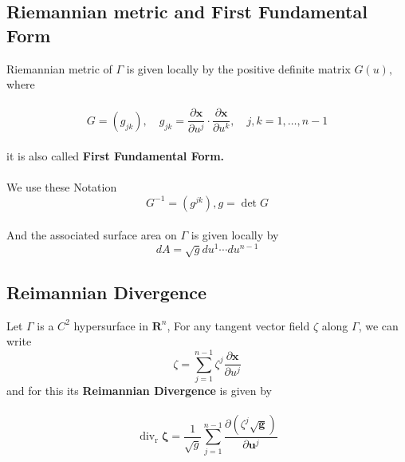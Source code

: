 \documentclass[oneside]{book}
\begin{document}
	\subsection{Riemannian metric and First Fundamental Form}
	\label{ss:12}
	{Riemannian metric} of $\Gamma$ is given
	locally by the positive definite matrix $G(u),$ where 
	\\\\
	\begin{equation}
	\label{eq17}  
	G=\left(g_{j k}\right), \quad g_{j k}=\frac{\partial \mathbf{x}}{\partial u^{j}} \cdot \frac{\partial \mathbf{x}}{\partial u^{k}}, \quad j, k=1, \ldots, n-1     \end{equation}
	\\
	it is also called \textbf{First Fundamental Form.} \\\\
	We use these Notation \\
	\[ G^{-1}=\left(g^{j k}\right),   g=\operatorname{det}{G} \] \\
	And the associated surface area on  
	$\Gamma$ is given locally by \\
	
	
	\begin{equation}
	\label{eq18}  
	d A=\sqrt{g} d u^{1} \cdots d u^{n-1} 
	\end{equation}
	
	
	
	
	
	
	
	
	
	
	\subsection{Reimannian Divergence}
	\label{ss:13}
	Let $\Gamma$ is a $C^{2}$ hypersurface in $\mathbf{R}^{n}$,
	For any tangent vector field $\zeta$ along $\Gamma$, we can write 
	$$
	\zeta=\sum_{j=1}^{n-1} \zeta^{j} \frac{\partial \mathbf{x}}{\partial u^{j}}
	$$
	and for this its \textbf{Reimannian Divergence} is given by \\\\
	\begin{equation}
	\label{eq19}  
	\operatorname{div}_{\mathrm{r}} \boldsymbol{\zeta}=\frac{1}{\sqrt{g}} \sum_{j=1}^{n-1} \frac{\partial\left(\zeta^{j} \sqrt{\boldsymbol{g}}\right)}{\partial \boldsymbol{u}^{j}}  
	\end{equation}
	
	
	
	
	
\end{document}
